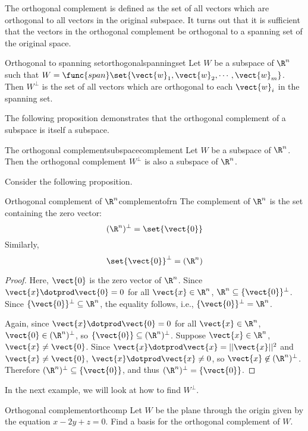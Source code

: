 The orthogonal complement is defined as the set of all vectors which are orthogonal to all vectors in the original subspace. It turns out that it is sufficient that the vectors in the orthogonal complement be orthogonal to a spanning set of the original space.

\begin{proposition}{Orthogonal to spanning set}{orthogonalspanningset}
Let $W$ be a subspace of $\R^n$ such that $W = \func{span} \set{\vect{w}_1, \vect{w}_2, \cdots, \vect{w}_m }$. Then $W^{\perp}$ is the set of all vectors which are orthogonal to each $\vect{w}_i$ in the spanning set. 
\end{proposition}

The following proposition demonstrates that the orthogonal complement of a subspace is itself a subspace. 

\begin{proposition}{The orthogonal complement}{subspacecomplement}
Let $W$ be a subspace of $\R^n$. Then the orthogonal complement $W^{\perp}$ is also a subspace of $\R^n$.
\end{proposition}

Consider the following proposition.

\begin{proposition}{Orthogonal complement of $\R^n$}{complementofrn}
The complement of $\R^n$ is the set containing the zero vector:
\[
 (\R^n)^{\perp} = \set{\vect{0} }
\]
Similarly, 
\[
\set{\vect{0} }^{\perp} = (\R^n)
\]
\end{proposition}

\begin{proof}
Here, $\vect{0}$ is the zero vector of $\R^n$.
Since $\vect{x}\dotprod\vect{0}=0$ for all $\vect{x}\in\R^n$, 
$\R^n\subseteq\{\vect{0}\}^{\perp}$.
Since $\{\vect{0}\}^{\perp}\subseteq\R^n$, the equality follows,
i.e., $\{\vect{0}\}^{\perp}=\R^n$.

Again, since $\vect{x}\dotprod\vect{0}=0$ for all $\vect{x}\in\R^n$,
$\vect{0}\in (\R^n)^{\perp}$, so $\{\vect{0}\}\subseteq(\R^n)^{\perp}$.
Suppose $\vect{x}\in\R^n$, $\vect{x}\neq\vect{0}$.  
Since $\vect{x}\dotprod\vect{x}=||\vect{x}||^2$ and $\vect{x}\neq\vect{0}$,
$\vect{x}\dotprod\vect{x}\neq 0$, so $\vect{x}\not\in(\R^n)^{\perp}$.
Therefore $(\R^n)^{\perp}\subseteq \{\vect{0}\}$, and thus
$(\R^n)^{\perp}=\{\vect{0}\}$.
\end{proof}

In the next example, we will look at how to find
$W^{\perp}$.

\begin{example}{Orthogonal complement}{orthcomp}
Let $W$ be the  plane through the origin given by the equation  $x - 2y + z = 0$. Find
a basis for the orthogonal complement of $W$.
\end{example}

